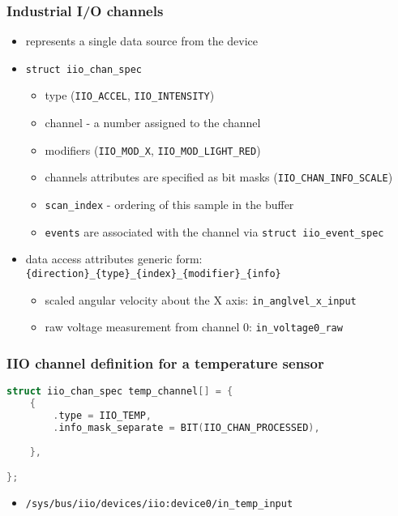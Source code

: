 \documentclass[aspectratio=169]{beamer}
\begin{document}
\begin{frame}
\frametitle{Industrial I/O channels}
\begin{itemize}
    \item represents a single data source from the device
    \item \texttt{struct iio\_chan\_spec}
    \begin{itemize}
        \item type (\texttt{IIO\_ACCEL}, \texttt{IIO\_INTENSITY})
        \item channel - a number assigned to the channel
        \item modifiers (\texttt{IIO\_MOD\_X}, \texttt{IIO\_MOD\_LIGHT\_RED})
        \item channels attributes are specified as bit masks (\texttt{IIO\_CHAN\_INFO\_SCALE})
        \item \texttt{scan\_index} - ordering of this sample in the buffer
        \item \texttt{events} are associated with the channel via \texttt{struct iio\_event\_spec}
    \end{itemize}
    \item data access attributes generic form: \texttt{\{direction\}\_\{type\}\_\{index\}\_\{modifier\}\_\{info\}}\begin{itemize}
        \item scaled angular velocity about the X axis: \texttt{in\_anglvel\_x\_input}
        \item raw voltage measurement from channel 0: \texttt{in\_voltage0\_raw}
    \end{itemize}
\end{itemize}
\end{frame}


\begin{frame}[fragile]
\frametitle{IIO channel definition for a temperature sensor}
\begin{lstlisting}[language=C]
struct iio_chan_spec temp_channel[] = {
    {
        .type = IIO_TEMP,
        .info_mask_separate = BIT(IIO_CHAN_PROCESSED),
    
    },

};
\end{lstlisting}
\begin{itemize}
    \item \texttt{/sys/bus/iio/devices/iio:device0/in\_temp\_input}
\end{itemize}
\end{frame}
\end{document}
